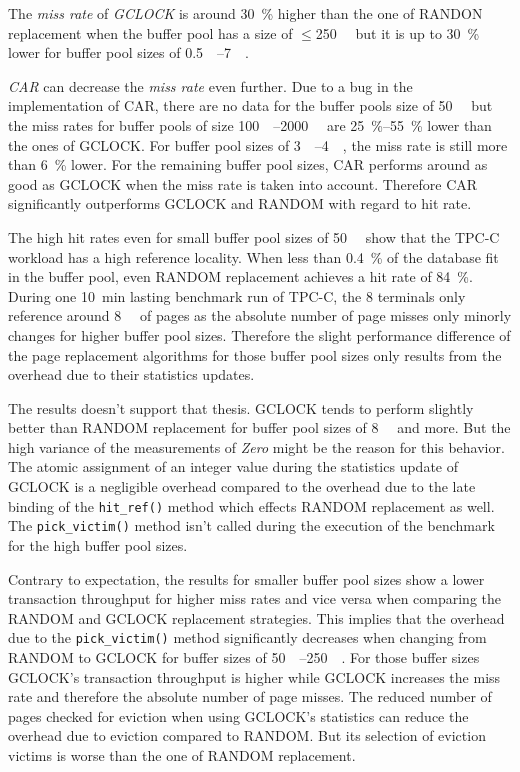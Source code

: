 	The \emph{miss rate} of \emph{GCLOCK} is around \SI{30}{\percent} higher than the one of RANDON replacement when the buffer pool has a size of $\leq$\SI{250}{\mebi\byte} but it is up to \SI{30}{\percent} lower for buffer pool sizes of \SIrange{0.5}{7}{\gibi\byte}.
	
	\emph{CAR} can decrease the \emph{miss rate} even further. Due to a bug in the implementation of CAR, there are no data for the buffer pools size of \SI{50}{\mebi\byte} but the miss rates for buffer pools of size \SIrange{100}{2000}{\mebi\byte} are \SIrange{25}{55}{\percent} lower than the ones of GCLOCK. For buffer pool sizes of \SIrange{3}{4}{\gibi\byte}, the miss rate is still more than \SI{6}{\percent} lower. For the remaining buffer pool sizes, CAR performs around as good as GCLOCK when the miss rate is taken into account. Therefore CAR significantly outperforms GCLOCK and RANDOM with regard to hit rate.
	
	The high hit rates even for small buffer pool sizes of \SI{50}{\mebi\byte} show that the TPC-C workload has a high reference locality. When less than \SI{0.4}{\percent} of the database fit in the buffer pool, even RANDOM replacement achieves a hit rate of \SI{84}{\percent}. During one \SI{10}{\minute} lasting benchmark run of TPC-C, the \num{8} terminals only reference around \SI{8}{\gibi\byte} of pages as the absolute number of page misses only minorly changes for higher buffer pool sizes. Therefore the slight performance difference of the page replacement algorithms for those buffer pool sizes only results from the overhead due to their statistics updates.
	
	The results doesn't support that thesis. GCLOCK tends to perform slightly better than RANDOM replacement for buffer pool sizes of \SI{8}{\gibi\byte} and more. But the high variance of the measurements of \emph{Zero} might be the reason for this behavior. The atomic assignment of an integer value during the statistics update of GCLOCK is a negligible overhead compared to the overhead due to the late binding of the \lstinline{hit_ref()} method which effects RANDOM replacement as well. The \lstinline{pick_victim()} method isn't called during the execution of the benchmark for the high buffer pool sizes.
	
	Contrary to expectation, the results for smaller buffer pool sizes show a lower transaction throughput for higher miss rates and vice versa when comparing the RANDOM and GCLOCK replacement strategies. This implies that the overhead due to the \lstinline{pick_victim()} method significantly decreases when changing from RANDOM to GCLOCK for buffer sizes of \SIrange{50}{250}{\mebi\byte}. For those buffer sizes GCLOCK's transaction throughput is higher while GCLOCK increases the miss rate and therefore the absolute number of page misses. The reduced number of pages checked for eviction when using GCLOCK's statistics can reduce the overhead due to eviction compared to RANDOM. But its selection of eviction victims is worse than the one of RANDOM replacement.
	
